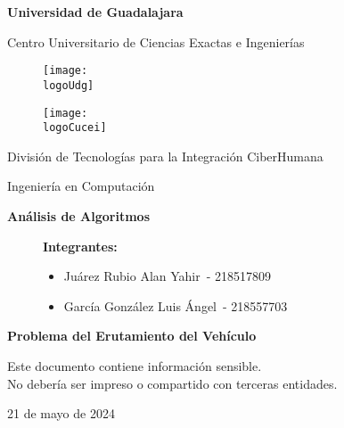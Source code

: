 \documentclass[10pt,twocolumn,letterpaper]{article}
\title{\fontsize{24}{28.8}\selectfont \theTitle}
\date{}
\newcommand{\logoUdg}{logo-udg.jpg}
\newcommand{\logoCucei}{logo-cucei.jpg}
\newcommand{\universidad}{Universidad de Guadalajara}
\newcommand{\cede}{Centro Universitario de Ciencias Exactas e Ingenierías}
\newcommand{\materia}{Análisis de Algoritmos}
\newcommand{\carrera}{Ingeniería en Computación}
\newcommand{\division}{División de Tecnologías para la Integración CiberHumana}
\newcommand{\theTitle}{Problema del Erutamiento del Vehículo}
\newcommand{\startDate}{21 de mayo de 2024}
\newcommand{\theAuthor}{Juárez Rubio Alan Yahir}
\newcommand{\bAuthor}{García González Luis Ángel}
\newcommand{\theAuthorCode}{218517809}
\newcommand{\bAuthorCode}{218557703}
\newcommand{\nl}{\par\vspace{0.4cm}}
\begin{document}

\begin{titlepage}
	\centering
	{\huge\textbf{\universidad}}\par\vspace{0.6cm}
	{\LARGE{\cede}}\vfill
	
	\begin{figure}[h]
		\begin{minipage}[t]{0.45\textwidth}
			\centering
			\texttt{[image: \\logoUdg]}
		\end{minipage}
		\hfill
		\begin{minipage}[t]{0.45\textwidth}
			\centering
			\texttt{[image: \\logoCucei]}
		\end{minipage}
	\end{figure}\vfill
	
	\Large{
		\division\nl
		\carrera\nl
		\textbf{\materia}\nl
	}
	\begin{figure}[h]
		\centering
		\begin{minipage}[t]{0.75\textwidth}
			{\Large
				\textbf{Integrantes:}
				\begin{itemize}
					\item \theAuthor\ - \theAuthorCode
					\item \bAuthor\ - \bAuthorCode
				\end{itemize}
			}
		\end{minipage}
	\end{figure}\vfill
	{\LARGE{\textbf{\theTitle}}}\vfill
	
	\begin{tcolorbox}[colback=red!5!white, colframe=red!75!black]
		\centering
		Este documento contiene información sensible.\\
		No debería ser impreso o compartido con terceras entidades.
	\end{tcolorbox}\vfill

	{\large \startDate}\par
\end{titlepage}

\maketitle
\end{document}
